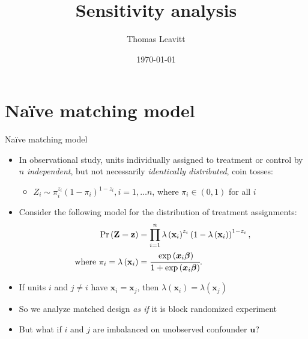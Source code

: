 \documentclass[table, xcolor={dvipsnames}, 9pt]{beamer}
\title[]{Sensitivity analysis} %
\author{Thomas Leavitt} %
\institute[] %
{
\medskip
\textit{} %
}
\date{\today} %
\theoremstyle{newstyle}
\begin{document}
\begin{frame}
\titlepage %
\end{frame}


\section{Na\"{i}ve matching model}
\begin{frame}{Na\"{i}ve matching model}
\vfill
\begin{itemize} \vfill
\item In observational study, units individually assigned to treatment or control by $n$ \textit{independent}, but not necessarily \textit{identically distributed}, coin tosses: \pause \vfill
\begin{itemize} \vfill
\item $Z_i \sim \pi_i^{z_i} \left(1 - \pi_i\right)^{1 - z_i}, i = 1, \dots n$, where $\pi_i \in (0, 1)$ for all $i$ \vfill
\end{itemize} \vfill
\item \pause Consider the following model for the distribution of treatment assignments: \pause \vfill
\begin{align*} 
\Pr\left(\mathbf{Z} = \mathbf{z}\right) & = \prod \limits_{i = 1}^n \lambda\left(\mathbf{x}_i\right)^{z_i} \left(1 - \lambda\left(\mathbf{x}_i\right)\right)^{1 - z_i}, \\
\text{where } \pi_i = \lambda\left(\mathbf{x}_i \right) & = \cfrac{\exp\left(\bm{x}_i\bm{\beta}\right)}{1 + \exp\left(\bm{x}_i\bm{\beta} \right)}.
\end{align*} \vfill
\item \pause If units $i$ and $j \neq i$ have $\bm{x}_i = \bm{x}_j$, then $\lambda\left(\mathbf{x}_i \right) = \lambda\left(\mathbf{x}_j \right)$ \vfill
\item \pause So we analyze matched design \textit{as if} it is block randomized experiment \vfill
\item But what if $i$ and $j$ are imbalanced on unobserved confounder $\bm{u}$? \vfill
\end{itemize} \vfill
\end{frame}
\end{document}
